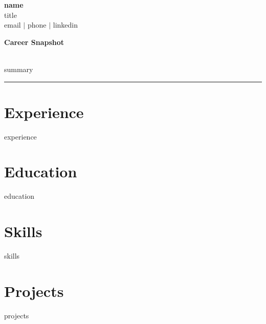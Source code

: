 \documentclass[11pt]{article}
\begin{document}
\pagestyle{empty}

\begin{minipage}[t]{0.65\textwidth}
  {\LARGE\bfseries {name}}\\
  {\large\color{secondary} {title}}\\[8pt]
  {\small {email} $\vert$ {phone} $\vert$ {linkedin}}\\
\end{minipage}
\begin{minipage}[t]{0.33\textwidth}
  \raggedleft
  \colorbox{accent}{\parbox[t]{0.96\linewidth}{\vspace{6pt}\color{white}\textbf{Career Snapshot}\vspace{6pt}}}\\[8pt]
  \textcolor{secondary}{\small {summary}}
\end{minipage}

\vspace{12pt}
\noindent\rule{\linewidth}{0.5pt}
\vspace{12pt}

\section*{Experience}
{experience}

\section*{Education}
{education}

\section*{Skills}
{skills}

\section*{Projects}
{projects}
\end{document}
